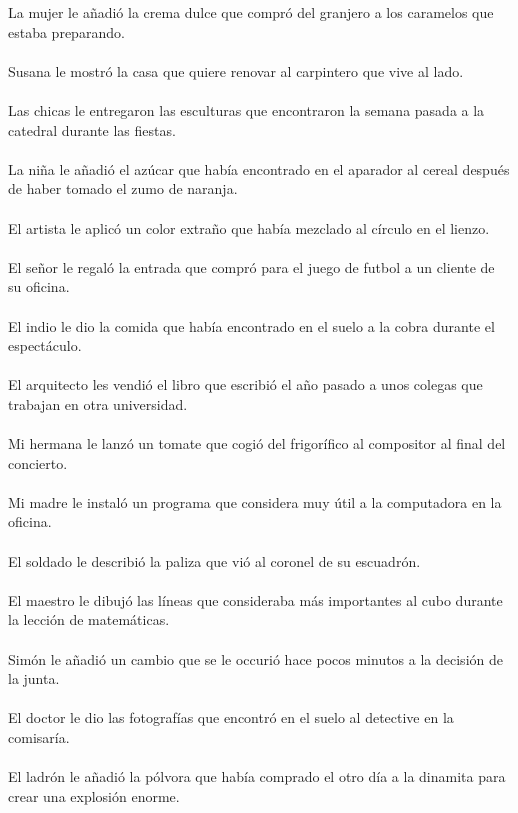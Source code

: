 La mujer le añadió la crema dulce que compró del granjero a los caramelos que estaba preparando.	\\	\\
Susana le mostró la casa que quiere renovar al carpintero que vive al lado.	\\	\\
Las chicas le entregaron las esculturas que encontraron la semana pasada a la catedral durante las fiestas.	\\	\\
La niña le añadió el azúcar que había encontrado en el aparador al cereal después de haber tomado el zumo de naranja.	\\	\\
El artista le aplicó un color extraño que había mezclado al círculo en el lienzo.	\\	\\
El señor le regaló la entrada que compró para el juego de futbol a un cliente de su oficina.	\\	\\
El indio le dio la comida que había encontrado en el suelo a la cobra durante el espectáculo.	\\	\\
El arquitecto les vendió el libro que escribió el año pasado a unos colegas que trabajan en otra universidad.	\\	\\
Mi hermana le lanzó un tomate que cogió del frigorífico al compositor al final del concierto.	\\	\\
Mi madre le instaló un programa que considera muy útil a la computadora en la oficina.	\\	\\
El soldado le describió la paliza que vió al coronel de su escuadrón.	\\	\\
El maestro le dibujó las líneas que consideraba más importantes al cubo durante la lección de matemáticas.	\\	\\
Simón le añadió un cambio que se le occurió hace pocos minutos a la decisión de la junta.	\\	\\
El doctor le dio las fotografías que encontró en el suelo al detective en la comisaría.	\\	\\
El ladrón le añadió la pólvora que había comprado el otro día a la dinamita para crear una explosión enorme.	\\	\\
